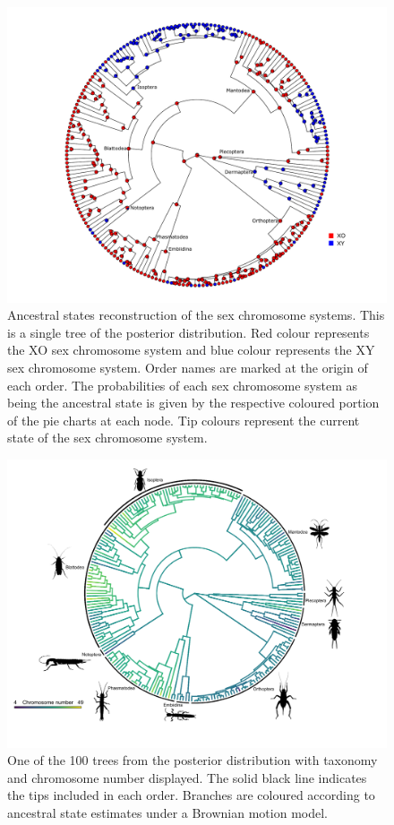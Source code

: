 \documentclass[]{rsos}%
\begin{document}
\begin{figure}[h!]
\centering \includegraphics[width=1\textwidth]{sex_asr_plot.pdf}
\caption{Ancestral states reconstruction of the sex chromosome systems. 
This is a single tree of the posterior distribution. 
Red colour represents the XO sex chromosome system and blue colour represents the XY sex chromosome system. Order names are marked at the origin of each order. 
The probabilities of each sex chromosome system as being the ancestral state is given by the respective coloured portion of the pie charts at each node. 
Tip colours represent the current state of the sex chromosome system.}
\label{fig:sex.asr.plot}
\end{figure}

\newpage
\begin{figure}[h!]
\centering \includegraphics[width=1\textwidth]{phyloplot.pdf}
\caption{One of the 100 trees from the posterior distribution with taxonomy and chromosome number displayed. 
The solid black line indicates the tips included in each order. 
Branches are coloured according to ancestral state estimates under a Brownian motion model. }
\label{fig:phyloplot}
\end{figure}
\end{document}
